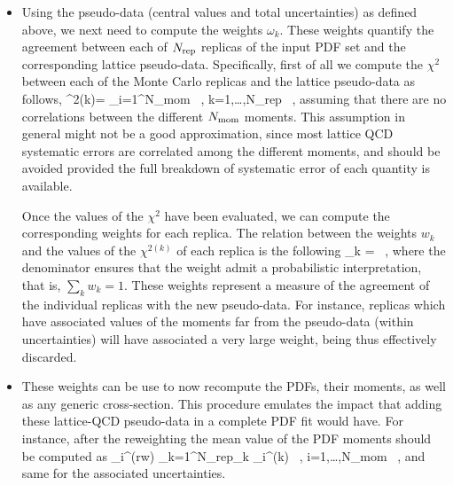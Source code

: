 \begin{itemize}
\item Using the pseudo-data (central values and total uncertainties)
  as defined above, we next need to compute
  the weights  $\omega_k$.
  These weights
  quantify the agreement between each of $N_{\rm rep}$ replicas
  of the input PDF set and the corresponding lattice pseudo-data.
  Specifically, first of all we compute the $\chi^2$ between each of the Monte Carlo
  replicas and the lattice pseudo-data as follows,
  \be
  \chi^{2(k)}= \sum_{i=1}^{\rm N_{\rm mom}}  \, , \quad k=1,\ldots,N_{\rm rep} \, ,
  \ee
  assuming that there are no correlations between the different $N_{\rm mom}$ moments.
  This assumption in general might not be a good approximation, since most lattice
  QCD systematic errors are correlated among the different moments, and should be
  avoided provided the full breakdown of systematic error of each quantity is available.

  
  Once the values of the $\chi^2$ have been evaluated,
  we can compute the corresponding weights for each replica.
  The relation between the weights $w_k$  and the values of
  the $\chi^{2(k)}$ of each replica is the following
  \be
  \omega_k = \, ,
  \ee
  where the denominator ensures that the weight admit
  a probabilistic interpretation, that is, $\sum_k w_k=1$.
  These weights represent a measure of the agreement of the individual replicas with the new pseudo-data.
  For instance, replicas which have associated values
  of the moments far from the pseudo-data (within uncertainties) will
  have associated a very large weight, being thus effectively discarded.
\item These weights can be use to now recompute the PDFs, their moments,
  as well as any generic cross-section.
  This procedure emulates the
  impact that adding these lattice-QCD pseudo-data in a complete PDF fit would have.
  For instance, after the reweighting the mean value of
  the PDF moments should be computed as
   \be
  \label{eq:pseudodatadef1}
  _i^{\rm (rw)} \equiv {}\sum_{k=1}^{N_{\rm rep}}\omega_k
  _i^{\rm (k)} \, , \quad i=1,\ldots,N_{\rm mom} \, ,
  \ee
  and same for the associated uncertainties.
\end{itemize}

